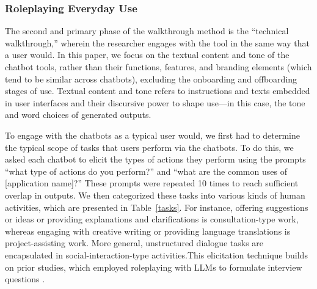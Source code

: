 

\subsubsection{Roleplaying Everyday Use}

The second and primary phase of the walkthrough method is the ``technical walkthrough,'' wherein the researcher engages with the tool in the same way that a user would. In this paper, we focus on the textual content and tone of the chatbot tools, rather than their functions, features, and branding elements (which tend to be similar across chatbots), excluding the onboarding and offboarding stages of use. Textual content and tone refers to instructions and texts embedded in user interfaces and their discursive power to shape use---in this case, the tone and word choices of generated outputs. 

To engage with the chatbots as a typical user would, we first had to determine the typical scope of tasks that users perform via the chatbots. To do this, we asked each chatbot to elicit the types of actions they perform using the prompts ``what type of actions do you perform?'' and ``what are the common uses of [application name]?'' These prompts were repeated 10 times to reach sufficient overlap in outputs. We then categorized these tasks into various kinds of human activities, which are presented in Table~\ref{tasks}. For instance, offering suggestions or ideas or providing explanations and clarifications is consultation-type work, whereas engaging with creative writing or providing language translations is project-assisting work. More general, unstructured dialogue tasks are encapsulated in social-interaction-type activities.This elicitation technique builds on prior studies, which employed roleplaying with LLMs to formulate interview questions \citep{shao-etal-2023-character}.



